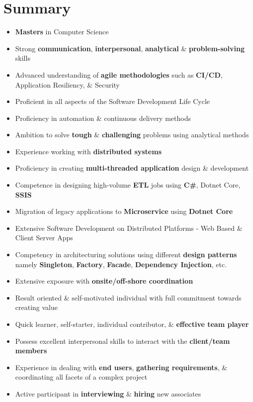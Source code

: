 \documentclass[10pt, letterpaper]{article}
\begin{document}
	\section{Summary}
	\begin{itemize}
		\item \textbf{\color{primaryColor}Masters} in Computer Science
		\item Strong \textbf{\color{primaryColor}communication}, \textbf{\color{primaryColor}interpersonal}, \textbf{\color{primaryColor}analytical} \& \textbf{\color{primaryColor}problem-solving} skills
		\item Advanced understanding of \textbf{\color{primaryColor}agile methodologies} such as \textbf{\color{primaryColor}CI/CD}, Application Resiliency, \& Security
		\item Proficient in all aspects of the Software Development Life Cycle
		\item Proficiency in automation \& continuous delivery methods
		\item Ambition to solve \textbf{\color{primaryColor}tough} \& \textbf{\color{primaryColor}challenging} problems using analytical methods
		\item Experience working with \textbf{\color{primaryColor}distributed systems}
		\item Proficiency in creating \textbf{\color{primaryColor}multi-threaded application} design \& development
		\item Competence in designing high-volume \textbf{\color{primaryColor}ETL} jobs using \textbf{\color{primaryColor}C\#}, Dotnet Core, \textbf{\color{primaryColor}SSIS}
		\item Migration of legacy applications to \textbf{\color{primaryColor}Microservice} using \textbf{\color{primaryColor}Dotnet Core}
		\item Extensive Software Development on Distributed Platforms - Web Based \& Client Server Apps
		\item Competency in architecturing solutions using different \textbf{\color{primaryColor}design patterns} namely \textbf{\color{primaryColor}Singleton}, \textbf{\color{primaryColor}Factory}, \textbf{\color{primaryColor}Facade}, \textbf{\color{primaryColor}Dependency Injection}, etc.
		\item Extensive exposure with \textbf{\color{primaryColor}onsite/off-shore coordination}
		\item Result oriented \& self-motivated individual with full commitment towards creating value
		\item Quick learner, self-starter, individual contributor, \& \textbf{\color{primaryColor}effective team player}
		\item Possess excellent interpersonal skills to interact with the \textbf{\color{primaryColor}client/team members}
		\item Experience in dealing with \textbf{\color{primaryColor}end users}, \textbf{\color{primaryColor}gathering requirements}, \& coordinating all facets of a complex project
		\item Active participant in \textbf{\color{primaryColor}interviewing} \& \textbf{\color{primaryColor}hiring} new associates
	\end{itemize}
	
\end{document}
